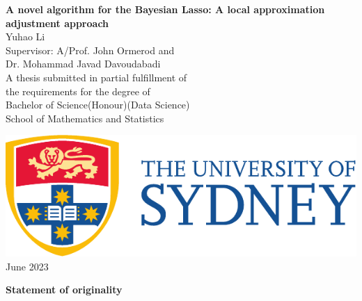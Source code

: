 \begin{titlepage}
\centering
{}
\vspace*{\fill}
\huge{\textbf{{\bf\Huge A novel algorithm for the Bayesian Lasso: A local approximation adjustment approach}}}\\



\vspace{2.5cm}
\LARGE{Yuhao Li}\\
\vspace{1cm}
\large{Supervisor: A/Prof. John Ormerod and \\ Dr. Mohammad Javad Davoudabadi}\\
\large{A thesis submitted in partial fulfillment of \\ the requirements for the degree of \\  Bachelor of Science(Honour)(Data Science)} \\
\vspace{1cm}
\large{School of Mathematics and Statistics}\\
\vspace{1.5cm}
\date{September 2021}
    \includegraphics[scale=0.75]{UsydLogo.pdf}\\
\vspace{1.5cm}
\large{June 2023}\\
\vspace*{\fill}

\thispagestyle{empty}
\end{titlepage}



\pagebreak
\hspace{0pt}
\begin{center}
    \textbf{\large Statement of originality}\\
    \vspace{0.5cm}
\end{center}

